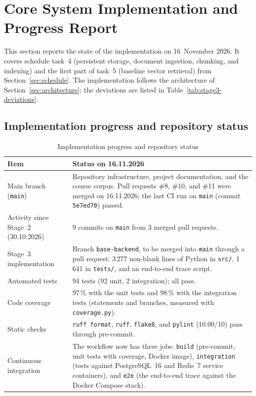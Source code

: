 \documentclass[12pt,a4paper]{article}
\begin{document}
\clearpage
\section{Core System Implementation and Progress Report}
\label{sec:implementation}

This section reports the state of the implementation on 16~November
2026. It covers schedule task~4 (persistent storage, document
ingestion, chunking, and indexing) and the first part of task~5
(baseline vector retrieval) from Section~\ref{sec:schedule}. The
implementation follows the architecture of
Section~\ref{sec:architecture}; the deviations are listed in
Table~\ref{tab:stage3-deviations}.

\subsection{Implementation progress and repository status}
\label{sec:stage3-status}

\begin{table}[htbp]
\centering
\small
\renewcommand{\arraystretch}{1.3}
\begin{tabularx}{\textwidth}{|p{45mm}|X|}
\hline
\textbf{Item} & \textbf{Status on 16.11.2026} \\
\hline
Main branch (\texttt{main}) &
Repository infrastructure, project documentation, and the course
corpus. Pull requests \#8, \#10, and \#11 were merged on 16.11.2026;
the last CI run on \texttt{main} (commit \texttt{5e7ed70}) passed. \\
\hline
Activity since Stage~2 (30.10.2026) &
9 commits on \texttt{main} from 3 merged pull requests. \\
\hline
Stage~3 implementation &
Branch \texttt{base-backend}, to be merged into \texttt{main} through
a pull request: 3\,277 non-blank lines of Python in \texttt{src/},
1\,641 in \texttt{tests/}, and an end-to-end trace script. \\
\hline
Automated tests &
94 tests (92 unit, 2 integration); all pass. \\
\hline
Code coverage &
97\,\% with the unit tests and 98\,\% with the integration tests
(statements and branches, measured with \texttt{coverage.py}). \\
\hline
Static checks &
\texttt{ruff format}, \texttt{ruff}, \texttt{flake8}, and
\texttt{pylint} (10.00/10) pass through pre-commit. \\
\hline
Continuous integration &
The workflow now has three jobs: \texttt{build} (pre-commit, unit
tests with coverage, Docker image), \texttt{integration} (tests
against PostgreSQL~16 and Redis~7 service containers), and
\texttt{e2e} (the end-to-end trace against the Docker Compose stack). \\
\hline
\end{tabularx}
\caption{Implementation progress and repository status}
\label{tab:stage3-status}
\end{table}
\end{document}
